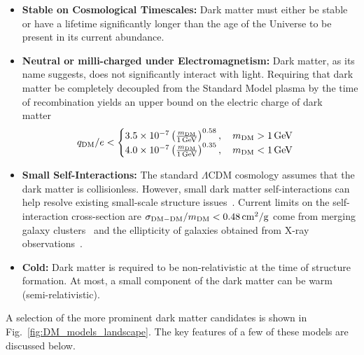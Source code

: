 \begin{itemize}
    \item \textbf{Stable on Cosmological Timescales:} Dark matter must either be stable or have a lifetime significantly longer than the age of the Universe to be present in its current abundance. 
    
    \item \textbf{Neutral or milli-charged under Electromagnetism:} Dark matter, as its name suggests, does not significantly interact with light. Requiring that dark matter be completely decoupled from the Standard Model plasma by the time of recombination yields an upper bound on the electric charge of dark matter~\cite{McDermott:2010pa_TurningLightsHow} 
    \begin{equation}
        q_\mathrm{DM}/e < \begin{cases}
            3.5\times10^{-7} \left( \frac{m_\mathrm{DM}}{1{\rm \,GeV}}\right)^{0.58},\quad m_\mathrm{DM} > 1{\rm \,GeV}\\
            4.0\times 10^{-7}\left( \frac{m_\mathrm{DM}}{1{\rm \,GeV}}\right)^{0.35},\quad m_\mathrm{DM} <1{\rm \,GeV}
        \end{cases}
    \end{equation}
    
    \item \textbf{Small Self-Interactions:} The standard $\Lambda$CDM cosmology assumes that the dark matter is collisionless. However, small dark matter self-interactions can help resolve existing small-scale structure issues~\cite{Tulin:2017ara_feb_DarkMatterSelfinteractions, Spergel:1999mh_Observationalevidenceselfinteracting}. Current limits on the self-interaction cross-section are $\sigma_{\mathrm{DM-DM}}/m_\mathrm{DM} < 0.48{\rm \,cm}^2/\mathrm{g}$ come from merging galaxy clusters~\cite{Randall:2008ppe_ConstraintsSelfInteractionCrossSection} and the ellipticity of galaxies obtained from X-ray observations~\cite{Buote:2002wd_ChandraEvidenceFlattened}.

    \item \textbf{Cold:} Dark matter is required to be non-relativistic at the time of structure formation. At most, a small component of the dark matter can be warm (semi-relativistic).
\end{itemize}
A selection of the more prominent dark matter candidates is shown in Fig.~\ref{fig:DM_models_landscape}. The key features of a few of these models are discussed below.

